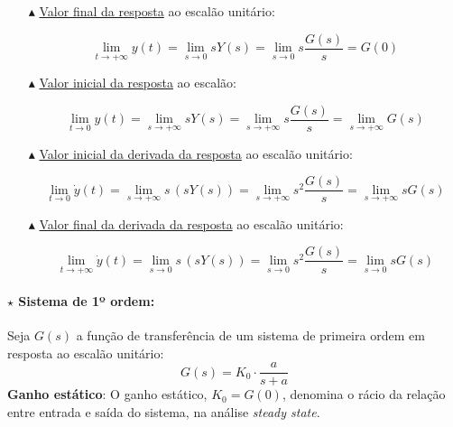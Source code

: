 {

\begin{mdframed}
    \begin{itemize}
    \item[$\blacktriangle$] \underline{Valor final da resposta} ao escalão unitário:
        
        \vspace{-1em}
        $$
            \lim_{t \to +\infty} y(t) = \lim_{s \to 0} sY(s) = \lim_{s \to 0} s\frac{G(s)}{s} = G(0)
        $$
        
    \vspace{-0.5em}
    \item[$\blacktriangle$] \underline{Valor inicial da resposta} ao escalão:
        
        \vspace{-1em}
        $$
            \lim_{t \to 0} y(t) = \lim_{s \to +\infty} sY(s) = \lim_{s \to +\infty} s\frac{G(s)}{s} = \lim_{s \to +\infty} G(s)
        $$
        
    \vspace{-0.5em}
    \item[$\blacktriangle$] \underline{Valor inicial da derivada da resposta} ao escalão unitário:
        
        \vspace{-1em}
        $$
            \lim_{t \to 0} \dot{y}(t) = \lim_{s \to +\infty} s\, (sY(s)) = \lim_{s \to +\infty} s^2\frac{G(s)}{s} = \lim_{s \to +\infty} sG(s)
        $$

    \vspace{-0.5em}
    \item[$\blacktriangle$] \underline{Valor final da derivada da resposta} ao escalão unitário:
        
        \vspace{-1em}
        $$
            \lim_{t \to +\infty} \dot{y}(t) = \lim_{s \to 0} s\, (sY(s)) = \lim_{s \to 0} s^2\frac{G(s)}{s} = \lim_{s \to 0} s G(s)
        $$
    \end{itemize}
\end{mdframed}
}
\paragraph[2.1.2.1 Sistema de 1º ordem]{$\pmb{\star}$ Sistema de 1º ordem:} Seja $G(s)$ a função de transferência de um sistema de primeira ordem em resposta ao escalão unitário:
$$
    G(s) = K_0 \cdot \dfrac{a}{s + a} 
$$
\noindent \textbf{Ganho estático}: O ganho estático, $K_0 = G(0)$, denomina o rácio da relação entre entrada e saída do sistema, na análise \textit{steady state}. 

